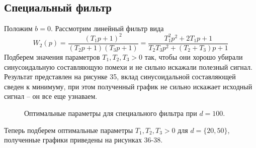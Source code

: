 \documentclass[a5paper, 10pt]{article}
\theoremstyle{definition}
\theoremstyle{plain}
\theoremstyle{remark}
\begin{document}
\newpage
\,
\newpage
\,
\newpage
\subsection{Специальный фильтр}
Положим $b=0$. Рассмотрим линейный фильтр вида
\begin{equation}
W_2(p)=\frac{\left( T_1p+1\right)^2}{\left(T_2p+1\right) \left(T_3p+1\right)}=\frac{T_1^2p^2+2T_1p+1}{T_2T_3p^2+\left( T_2 + T_3 \right)p+1}
\end{equation}
Подберем значения параметров $T_1, T_2, T_3 >0$ так, чтобы они хорошо убирали синусоидальную составляющую помехи и не сильно искажали полезный сигнал.\\

 Результат представлен на рисунке 35, вклад синусоидальной составляющей сведен к минимуму, при этом полученный график не сильно искажает исходный сигнал -- он все еще узнаваем.

\begin{figure}[h!]
\caption{Оптимальные параметры для специального фильтра при $d=100$.}
\end{figure}

\newpage
Теперь подберем оптимальные параметры $T_1, T_2, T_3 >0$ для $d=\{20, 50\}$, полученные графики приведены на рисунках 36-38.
\end{document}
